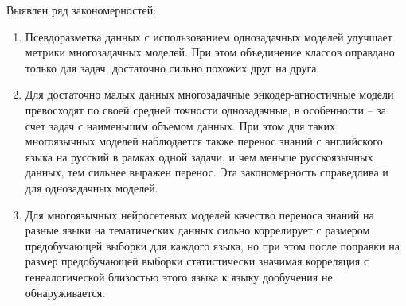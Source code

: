 Выявлен ряд закономерностей:
\begin{enumerate}
  \item {Псевдоразметка данных с использованием однозадачных моделей улучшает метрики многозадачных моделей. При этом объединение классов оправдано только для задач, достаточно сильно похожих друг на друга.}
  \item {Для достаточно малых данных многозадачные энкодер-агностичные модели превосходят по своей средней точности однозадачные, в особенности -- за счет задач с наименьшим объемом данных. При этом для таких многоязычных моделей наблюдается также перенос знаний с английского языка на русский в рамках одной задачи, и чем меньше русскоязычных данных, тем сильнее выражен перенос. Эта закономерность справедлива и для однозадачных моделей.}
  \item {Для многоязычных нейросетевых моделей качество переноса знаний на разные языки на тематических данных сильно коррелирует с размером предобучающей выборки для каждого языка, но при этом после поправки на размер предобучающей выборки статистически значимая корреляция с генеалогической близостью этого языка к языку дообучения не обнаруживается.}
\end{enumerate}

